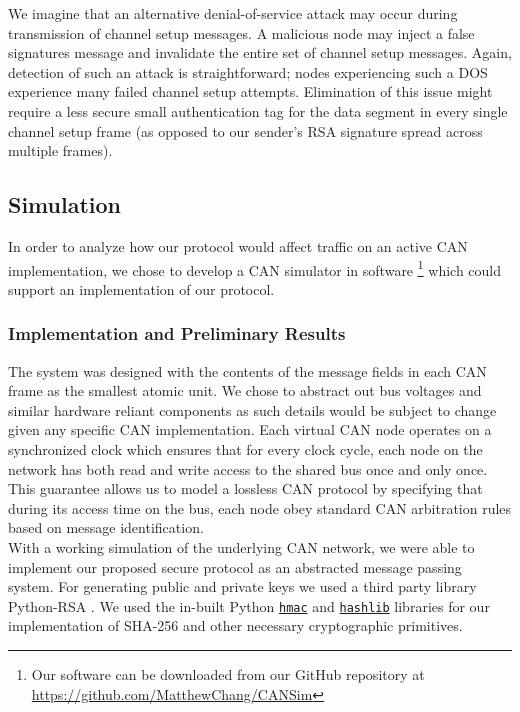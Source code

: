 \documentclass{article}
\begin{document}
    We imagine that an alternative denial-of-service attack may occur during transmission of channel setup messages. A malicious node may inject a false signatures message and invalidate the entire set of channel setup messages. Again, detection of such an attack is straightforward; nodes experiencing such a DOS experience many failed channel setup attempts. Elimination of this issue might require a less secure small authentication tag for the data segment in every single channel setup frame (as opposed to our sender's RSA signature spread across multiple frames).
    
    
    \subsection{Simulation}
    In order to analyze how our protocol would affect traffic on an active CAN implementation, we chose to develop a CAN simulator in software \footnote{Our software can be downloaded from our GitHub repository at \url{https://github.com/MatthewChang/CANSim}} which could support an implementation of our protocol.
    
    \subsubsection{Implementation and Preliminary Results}
    The system was designed with the contents of the message fields in each CAN frame as the smallest atomic unit. We chose to abstract out bus voltages and similar hardware reliant components as such details would be subject to change given any specific CAN implementation. Each virtual CAN node operates on a synchronized clock which ensures that for every clock cycle, each node on the network has both read and write access to the shared bus once and only once. This guarantee allows us to model a lossless CAN protocol by specifying that during its access time on the bus, each node obey standard CAN arbitration rules based on message identification.\\
    
    With a working simulation of the underlying CAN network, we were able to implement our proposed secure protocol as an abstracted message passing system. For generating public and private keys we used a third party library Python-RSA \cite{http://stuvel.eu/rsa}. We used the in-built Python \texttt{\href{https://docs.python.org/3/library/hmac.html}{hmac}} and \texttt{\href{https://docs.python.org/3/library/hashlib.html\#module-hashlib}{hashlib}} libraries for our implementation of SHA-256 and other necessary cryptographic primitives.
    
\end{document}
